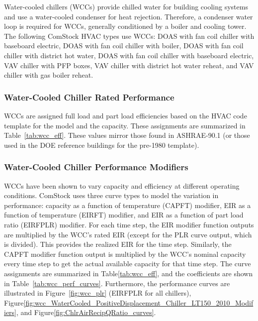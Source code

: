 Water-cooled chillers (WCCs) provide chilled water for building cooling systems and use a water-cooled condenser for heat rejection. Therefore, a condenser water loop is required for WCCs, generally conditioned by a boiler and cooling tower. The following ComStock HVAC types use WCCs: DOAS with fan coil chiller with baseboard electric, DOAS with fan coil chiller with boiler, DOAS with fan coil chiller with district hot water, DOAS with fan coil chiller with baseboard electric, VAV chiller with PFP boxes, VAV chiller with district hot water reheat, and VAV chiller with gas boiler reheat.

\subsubsection{Water-Cooled Chiller Rated Performance}

WCCs are assigned full load and part load efficiencies based on the HVAC code template for the model and the capacity. These assignments are summarized in Table~\ref{tab:wcc_eff}. These values mirror those found in ASHRAE-90.1 (or those used in the DOE reference buildings for the pre-1980 template).



\subsubsection{Water-Cooled Chiller Performance Modifiers}

WCCs have been shown to vary capacity and efficiency at different operating conditions. ComStock uses three curve types to model the variation in performance: capacity as a function of temperature (CAPFT) modifier, EIR as a function of temperature (EIRFT) modifier, and EIR as a function of part load ratio (EIRFPLR) modifier. For each time step, the EIR modifier function outputs are multiplied by the WCC's rated EIR (except for the PLR curve output, which is divided). This provides the realized EIR for the time step. Similarly, the CAPFT modifier function output is multiplied by the WCC's nominal capacity every time step to get the actual available capacity for that time step. The curve assignments are summarized in Table\ref{tab:wcc_eff}, and the coefficients are shown in Table~\ref{tab:wcc_perf_curves}. Furthermore, the performance curves are illustrated in Figure~\ref{fig:wcc_plr} (EIRFPLR for all chillers), Figure\ref{fig:wcc_WaterCooled_PositiveDisplacement_Chiller_LT150_2010_Modifiers}, and Figure\ref{fig:ChlrAirRecipQRatio_curves}.


